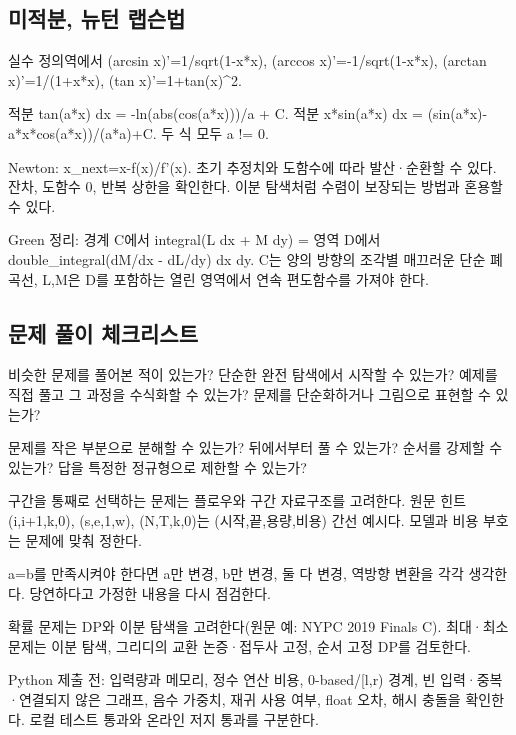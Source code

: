 \documentclass[landscape,8pt,a4paper,twocolumn]{extarticle}
\begin{document}
\subsection{미적분, 뉴턴 랩슨법}
\noindent 실수 정의역에서 (arcsin x)'=1/sqrt(1-x*x), (arccos x)'=-1/sqrt(1-x*x), (arctan x)'=1/(1+x*x), (tan x)'=1+tan(x)\textasciicircum{}2.\par\smallskip
\noindent 적분 tan(a*x) dx = -ln(abs(cos(a*x)))/a + C. 적분 x*sin(a*x) dx = (sin(a*x)-a*x*cos(a*x))/(a*a)+C. 두 식 모두 a != 0.\par\smallskip
\noindent Newton: x\_next=x-f(x)/f'(x). 초기 추정치와 도함수에 따라 발산·순환할 수 있다. 잔차, 도함수 0, 반복 상한을 확인한다. 이분 탐색처럼 수렴이 보장되는 방법과 혼용할 수 있다.\par\smallskip
\noindent Green 정리: 경계 C에서 integral(L dx + M dy) = 영역 D에서 double\_integral(dM/dx - dL/dy) dx dy. C는 양의 방향의 조각별 매끄러운 단순 폐곡선, L,M은 D를 포함하는 열린 영역에서 연속 편도함수를 가져야 한다.\par\smallskip
\subsection{문제 풀이 체크리스트}
\noindent 비슷한 문제를 풀어본 적이 있는가? 단순한 완전 탐색에서 시작할 수 있는가? 예제를 직접 풀고 그 과정을 수식화할 수 있는가? 문제를 단순화하거나 그림으로 표현할 수 있는가?\par\smallskip
\noindent 문제를 작은 부분으로 분해할 수 있는가? 뒤에서부터 풀 수 있는가? 순서를 강제할 수 있는가? 답을 특정한 정규형으로 제한할 수 있는가?\par\smallskip
\noindent 구간을 통째로 선택하는 문제는 플로우와 구간 자료구조를 고려한다. 원문 힌트 (i,i+1,k,0), (s,e,1,w), (N,T,k,0)는 (시작,끝,용량,비용) 간선 예시다. 모델과 비용 부호는 문제에 맞춰 정한다.\par\smallskip
\noindent a=b를 만족시켜야 한다면 a만 변경, b만 변경, 둘 다 변경, 역방향 변환을 각각 생각한다. 당연하다고 가정한 내용을 다시 점검한다.\par\smallskip
\noindent 확률 문제는 DP와 이분 탐색을 고려한다(원문 예: NYPC 2019 Finals C). 최대·최소 문제는 이분 탐색, 그리디의 교환 논증·접두사 고정, 순서 고정 DP를 검토한다.\par\smallskip
\noindent Python 제출 전: 입력량과 메모리, 정수 연산 비용, 0-based/[l,r) 경계, 빈 입력·중복·연결되지 않은 그래프, 음수 가중치, 재귀 사용 여부, float 오차, 해시 충돌을 확인한다. 로컬 테스트 통과와 온라인 저지 통과를 구분한다. \par\smallskip
\end{document}
